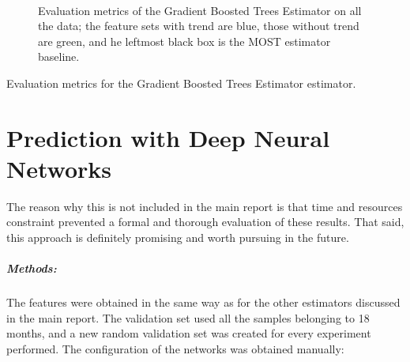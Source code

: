 \documentclass[a4paper]{book}
\begin{document}
\begin{figure}[h]
\hfill
{}\\

    \caption{Evaluation metrics of the Gradient Boosted Trees Estimator on all the data; the feature sets with trend are blue, those without trend are green, and he leftmost black box is the MOST estimator baseline.}
	\label{fig:gbr_results_all}
\end{figure}


\begin{table}[h]
\caption{Evaluation metrics for the Gradient Boosted Trees Estimator estimator.}
\label{tbl:gbr_results}

\end{table}




\chapter{Prediction with Deep Neural Networks}
The reason why this is not included in the main report is that time and resources constraint prevented a formal and thorough evaluation of these results. That said, this approach is definitely promising and worth pursuing in the future.
\paragraph{Methods:}
The features were obtained in the same way as for the other estimators discussed in the main report. The validation set used all the samples belonging to 18 months, and a new random validation set was created for every experiment performed. The configuration of the networks was obtained manually:
\end{document}

